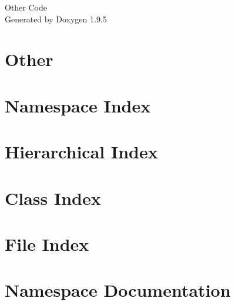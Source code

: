 \documentclass[twoside]{book}
\newcommand{\+}{\discretionary{\mbox{\scriptsize$\hookleftarrow$}}{}{}}
\newcommand{\clearemptydoublepage}{%
    \newpage{\pagestyle{empty}\cleardoublepage}%
  }
\begin{document}
  \raggedbottom
    \hypersetup{pageanchor=false,
                bookmarksnumbered=true,
                pdfencoding=unicode
               }
  \begin{titlepage}
  \vspace*{7cm}
  \begin{center}%
  {\Large Other Code}\\
  \vspace*{1cm}
  {\large Generated by Doxygen 1.9.5}\\
  \end{center}
  \end{titlepage}
  \clearemptydoublepage
  \tableofcontents
  \clearemptydoublepage
  \hypersetup{pageanchor=true}
\chapter{Other}
\label{md_README}

\chapter{Namespace Index}

\chapter{Hierarchical Index}

\chapter{Class Index}

\chapter{File Index}

\chapter{Namespace Documentation}












\end{document}
